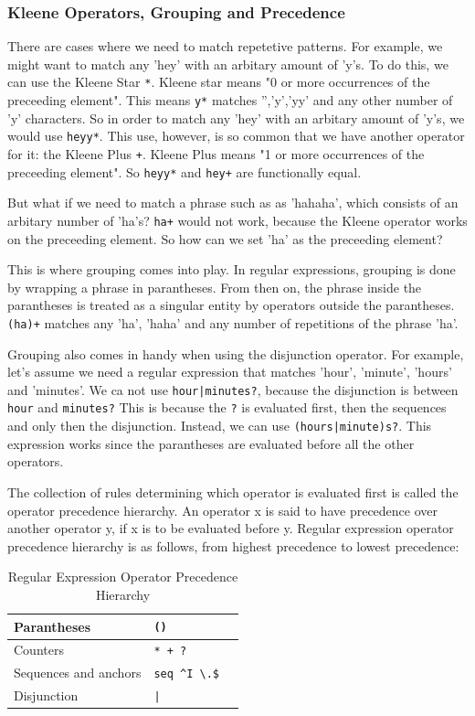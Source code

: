\subsubsection{Kleene Operators, Grouping and Precedence}

There are cases where we need to match repetetive patterns.
For example, we might want to match any 'hey' with an arbitary amount of 'y's.
To do this, we can use the Kleene Star \texttt{*}.
Kleene star means "0 or more occurrences of the preceeding element".
This means \texttt{y*} matches '','y','yy' and any other number of 'y' characters.
So in order to match any 'hey' with an arbitary amount of 'y's, we would use \texttt{heyy*}.
This use, however, is so common that we have another operator for it: the Kleene Plus \texttt{+}.
Kleene Plus means "1 or more occurrences of the preceeding element".
So \texttt{heyy*} and \texttt{hey+} are functionally equal.

But what if we need to match a phrase such as as 'hahaha', which consists of an arbitary number of 'ha's?
\texttt{ha+} would not work, because the Kleene operator works on the preceeding element.
So how can we set 'ha' as the preceeding element?

This is where grouping comes into play.
In regular expressions, grouping is done by wrapping a phrase in parantheses. 
From then on, the phrase inside the parantheses is treated as a singular entity by operators outside the parantheses.
\texttt{(ha)+} matches any 'ha', 'haha' and any number of repetitions of the phrase 'ha'.

Grouping also comes in handy when using the disjunction operator.
For example, let's assume we need a regular expression that matches 'hour', 'minute', 'hours' and 'minutes'.
We ca not use \texttt{hour|minutes?}, because the disjunction is between \texttt{hour} and \texttt{minutes?}
This is because the \texttt{?} is evaluated first, then the sequences and only then the disjunction. 
Instead, we can use \texttt{(hours|minute)s?}. 
This expression works since the parantheses are evaluated before all the other operators.

The collection of rules determining which operator is evaluated first is called the operator precedence hierarchy.
An operator x is said to have precedence over another operator y, if x is to be evaluated before y.
Regular expression operator precedence hierarchy is as follows, from highest precedence to lowest precedence:

\begin{table}[htbp]
  \caption[Regular Expression Operator Precedence Hierarchy]{Regular Expression Operator Precedence Hierarchy}\label{tab:re_oph}
  \centering
  \begin{tabular}{l l l}
    Parantheses&\texttt{()}&\\ \hline 
    Counters&\texttt{* + ?}&\\ \hline 
    Sequences and anchors&\texttt{seq \^{}I \textbackslash.\$}&\\ \hline 
    Disjunction&\texttt{|}&\\ \hline 
  \end{tabular}
\end{table}


